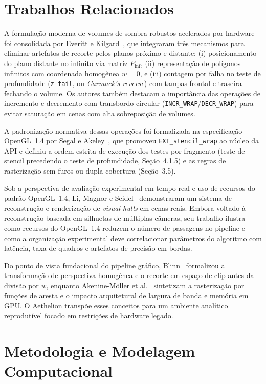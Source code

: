 \documentclass[conference]{IEEEtran}
\begin{document}
\section{Trabalhos Relacionados}

A formulação moderna de volumes de sombra robustos acelerados por hardware foi consolidada por Everitt e Kilgard~\cite{everitt2002}, que integraram três mecanismos para eliminar artefatos de recorte pelos planos próximo e distante: (i) posicionamento do plano distante no infinito via matriz $P_{\text{inf}}$, (ii) representação de polígonos infinitos com coordenada homogênea $w=0$, e (iii) contagem por falha no teste de profundidade (\texttt{z-fail}, ou \textit{Carmack's reverse}) com tampas frontal e traseira fechando o volume. Os autores também destacam a importância das operações de incremento e decremento com transbordo circular (\texttt{INCR\_WRAP}/\texttt{DECR\_WRAP}) para evitar saturação em cenas com alta sobreposição de volumes.

A padronização normativa dessas operações foi formalizada na especificação OpenGL~1.4 por Segal e Akeley~\cite{segal2002}, que promoveu \texttt{EXT\_stencil\_wrap} ao núcleo da API e definiu a ordem estrita de execução dos testes por fragmento (teste de stencil precedendo o teste de profundidade, Seção~4.1.5) e as regras de rasterização sem furos ou dupla cobertura (Seção~3.5).

Sob a perspectiva de avaliação experimental em tempo real e uso de recursos do padrão OpenGL~1.4, Li, Magnor e Seidel~\cite{li2003} demonstraram um sistema de reconstrução e renderização de \textit{visual hulls} em cenas reais. Embora voltado à reconstrução baseada em silhuetas de múltiplas câmeras, seu trabalho ilustra como recursos do OpenGL~1.4 reduzem o número de passagens no pipeline e como a organização experimental deve correlacionar parâmetros do algoritmo com latência, taxa de quadros e artefatos de precisão em bordas.

Do ponto de vista fundacional do pipeline gráfico, Blinn~\cite{blinn1993} formalizou a transformação de perspectiva homogênea e o recorte em espaço de clip antes da divisão por $w$, enquanto Akenine-Möller et al.~\cite{akenine2018} sintetizam a rasterização por funções de aresta e o impacto arquitetural de largura de banda e memória em GPU. O Aethelion transpõe esses conceitos para um ambiente analítico reprodutível focado em restrições de hardware legado.

\section{Metodologia e Modelagem Computacional}
\end{document}

